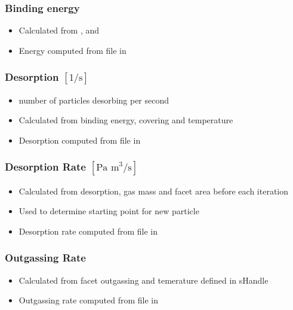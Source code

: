 \subsubsection{Binding energy}
\begin{itemize}[noitemsep,topsep=0pt, partopsep=0pt]
\item Calculated from ,  and 
\item Energy computed from  file in 
\end{itemize}

\subsubsection{Desorption $[1/\text{s}]$}
\begin{itemize}[noitemsep,topsep=0pt, partopsep=0pt]
\item number of particles desorbing per second
\item Calculated from binding energy, covering and temperature
\item Desorption computed from  file in 
\end{itemize}

\subsubsection{Desorption Rate $[\text{Pa m}^3/\text{s}]$}
\begin{itemize}[noitemsep,topsep=0pt, partopsep=0pt]
\item Calculated from desorption, gas mass and facet area before each iteration
\item Used to determine starting point for new particle
\item Desorption rate computed from  file in 
\end{itemize}

\subsubsection{Outgassing Rate}
\begin{itemize}[noitemsep,topsep=0pt, partopsep=0pt]
\item Calculated from facet outgassing and temerature defined in sHandle
\item Outgassing rate computed from  file in 
\end{itemize}

